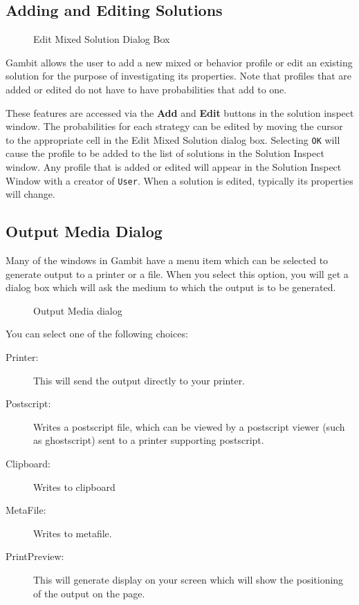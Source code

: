\documentclass[12pt]{report}
\begin{document}
\subsection{Adding and Editing Solutions}\label{SolnAddEdit}
\begin{figure}
\caption{Edit Mixed Solution Dialog Box}\label{fig_nfgsortfilt}
\end{figure}

Gambit allows the user to add a new mixed or behavior profile or edit
an existing solution for the purpose of investigating its properties.
Note that profiles that are added or edited do not have to have
probabilities that add to one.

These features are accessed via the {\bf Add} and {\bf Edit} buttons
in the solution inspect window.  The probabilities for each strategy
can be edited by moving the cursor to the appropriate cell in the Edit
Mixed Solution dialog box.  Selecting {\tt OK} will cause the profile
to be added to the list of solutions in the Solution Inspect window.
Any profile that is added or edited will appear in the Solution
Inspect Window with a creator of {\tt User}.  When a solution is
edited, typically its properties will change.

\subsection{Output Media Dialog}\label{OutputMedia}\label{outputsec}

Many of the windows in Gambit have a menu item which can be 
selected to generate output to a printer or a file.  When you select this 
option, you will get a dialog box which will ask the medium to which the 
output is to be generated.  

\begin{figure}
\caption{Output Media dialog}\label{fig_outputmedia}
\end{figure}

You can select one of the following choices:

\begin{description}
\item[Printer:] This will send the output directly to your printer. 
\item[Postscript:] Writes a postscript file, which can be viewed by a 
postscript viewer (such as ghostscript) sent to a printer 
supporting postscript.  
\item[Clipboard:] Writes to clipboard
\item[MetaFile:] Writes to metafile.  
\item[PrintPreview:]  This will generate display on your screen which will 
show the positioning of the output on the page.   
\end{description}
\end{document}

